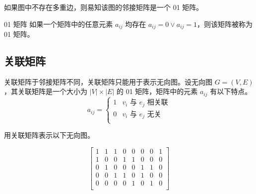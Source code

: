 如果图中不存在多重边，则易知该图的邻接矩阵是一个 01 矩阵。
\begin{info}{01 矩阵}
如果一个矩阵中的任意元素 $a_{ij}$ 均存在 $a_{ij}=0 \lor a_{ij}=1$，则该矩阵被称为 01 矩阵。
\end{info}

\subsection{关联矩阵}
关联矩阵于邻接矩阵不同，关联矩阵只能用于表示无向图。设无向图 $G=(V,E)$，其关联矩阵是一个大小为 $|V|\times|E|$ 的 01 矩阵，矩阵中的元素 $a_{ij}$ 有以下特点。
\begin{equation*}
    a_{ij}=
    \begin{cases}
        1 & \text{$v_i$ 与 $e_j$ 相关联} \\
        0 & \text{$v_i$ 与 $e_j$ 无关} \\
    \end{cases}
\end{equation*}

\begin{collections}
    \begin{example}
        用关联矩阵表示以下无向图。
        \vspace{-2em}
        \begin{center}
        \end{center}
    \end{example}
        \begin{solution}
            $$
            \begin{bmatrix}
                1 & 1 & 1 & 0 & 0 & 0 & 0 & 1 \\
                1 & 0 & 0 & 1 & 1 & 0 & 0 & 0 \\
                0 & 1 & 0 & 0 & 0 & 1 & 1 & 0 \\
                0 & 0 & 1 & 1 & 0 & 1 & 0 & 0 \\
                0 & 0 & 0 & 0 & 1 & 0 & 1 & 0 \\
            \end{bmatrix}
            $$
        \end{solution}
\end{collections}
